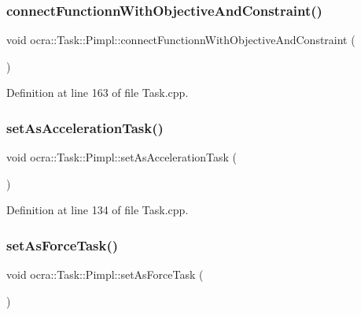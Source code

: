 \subsubsection{\texorpdfstring{connect\+Functionn\+With\+Objective\+And\+Constraint()}{connectFunctionnWithObjectiveAndConstraint()}}
{\footnotesize\ttfamily void ocra\+::\+Task\+::\+Pimpl\+::connect\+Functionn\+With\+Objective\+And\+Constraint (\begin{DoxyParamCaption}{ }\end{DoxyParamCaption})\hspace{0.3cm}{\ttfamily [inline]}}



Definition at line 163 of file Task.\+cpp.

\hypertarget{structocra_1_1Task_1_1Pimpl_a1b06484c1ce60c68a20df0369bdb8221}{}\label{structocra_1_1Task_1_1Pimpl_a1b06484c1ce60c68a20df0369bdb8221} 
\subsubsection{\texorpdfstring{set\+As\+Acceleration\+Task()}{setAsAccelerationTask()}}
{\footnotesize\ttfamily void ocra\+::\+Task\+::\+Pimpl\+::set\+As\+Acceleration\+Task (\begin{DoxyParamCaption}{ }\end{DoxyParamCaption})\hspace{0.3cm}{\ttfamily [inline]}}



Definition at line 134 of file Task.\+cpp.

\hypertarget{structocra_1_1Task_1_1Pimpl_a6591dc9a28cc7cc30473559600bf5cb6}{}\label{structocra_1_1Task_1_1Pimpl_a6591dc9a28cc7cc30473559600bf5cb6} 
\subsubsection{\texorpdfstring{set\+As\+Force\+Task()}{setAsForceTask()}}
{\footnotesize\ttfamily void ocra\+::\+Task\+::\+Pimpl\+::set\+As\+Force\+Task (\begin{DoxyParamCaption}{ }\end{DoxyParamCaption})\hspace{0.3cm}{\ttfamily [inline]}}



